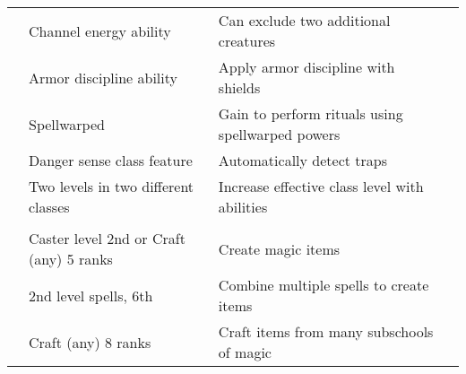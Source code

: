 {\begin{longtabu}{>{\lcol}p{10em} >{\lcol}p{15em} >{\lcol}X >{\lcol}p{3em}}
     & Channel energy ability & Can exclude two additional creatures &  \\
     & Armor discipline ability & Apply armor discipline with shields \\
     & Spellwarped & Gain to perform rituals using spellwarped powers \\
     & Danger sense class feature & Automatically detect traps &  \\
     & Two levels in two different classes & Increase effective class level with abilities \\

    \midrule
     &  &  &  \\
     & Caster level 2nd or Craft (any) 5 ranks & Create magic items &  \\
     & 2nd level spells, 6th & Combine multiple spells to create items &  \\
     & Craft (any) 8 ranks & Craft items from many subschools of magic &  \\


\end{longtabu}}
